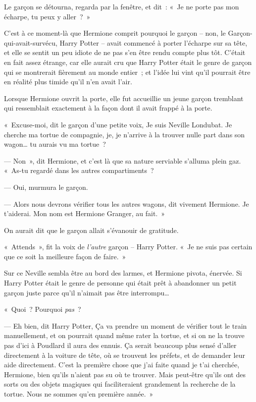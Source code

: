 Le garçon se détourna, regarda par la fenêtre, et dit~: «~Je ne porte pas mon écharpe, tu peux y aller~?~»

C'est à ce moment-là que Hermione comprit pourquoi le garçon -- non, le Garçon-qui-avait-survécu, Harry Potter -- avait commencé à porter l'écharpe sur sa tête, et elle se sentit un peu idiote de ne pas s'en être rendu compte plus tôt. C'était en fait assez étrange, car elle aurait cru que Harry Potter était le genre de garçon qui se montrerait fièrement au monde entier~; et l'idée lui vint qu'il pourrait être en réalité plus timide qu'il n'en avait l'air.

Lorsque Hermione ouvrit la porte, elle fut accueillie un jeune garçon tremblant qui ressemblait exactement à la façon dont il avait frappé à la porte.

«~Excuse-moi, dit le garçon d'une petite voix, Je suis Neville Londubat. Je cherche ma tortue de compagnie, je, je n'arrive à la trouver nulle part dans son wagon… tu aurais vu ma tortue~?

--- Non~», dit Hermione, et c'est là que sa nature serviable s'alluma plein gaz. «~As-tu regardé dans les autres compartiments~?

--- Oui, murmura le garçon.

--- Alors nous devrons vérifier tous les autres wagons, dit vivement Hermione. Je t'aiderai. Mon nom est Hermione Granger, au fait.~»

On aurait dit que le garçon allait s'évanouir de gratitude.

«~Attends~», fit la voix de \emph{l'autre} garçon -- Harry Potter. «~Je ne suis pas certain que ce soit la meilleure façon de faire.~»

Sur ce Neville sembla être au bord des larmes, et Hermione pivota, énervée. Si Harry Potter était le genre de personne qui était prêt à abandonner un petit garçon juste parce qu'il n'aimait pas être interrompu…

«~Quoi~? Pourquoi \emph{pas}~?

--- Eh bien, dit Harry Potter, Ça va prendre un moment de vérifier tout le train manuellement, et on pourrait quand même rater la tortue, et si on ne la trouve pas d'ici à Poudlard il aura des ennuis. Ça serait beaucoup plus sensé d'aller directement à la voiture de tête, où se trouvent les préfets, et de demander leur aide directement. C'est la première chose que j'ai faite quand je t'ai cherchée, Hermione, bien qu'ils n'aient pas su où te trouver. Mais peut-être qu'ils ont des sorts ou des objets magiques qui faciliteraient grandement la recherche de la tortue. Nous ne sommes qu'en première année.~»

